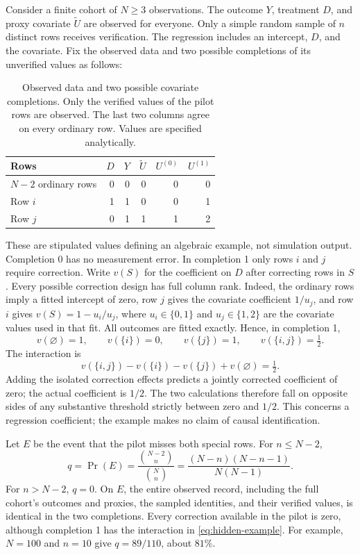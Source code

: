 \documentclass[11pt]{article}
\begin{document}
Consider a finite cohort of $N\geq 3$ observations. The outcome $Y$, treatment
$D$, and proxy covariate $\widetilde U$ are observed for everyone. Only a simple
random sample of $n$ distinct rows receives verification. The regression includes
an intercept, $D$, and the covariate. Fix the observed data and two possible
completions of its unverified values as follows:
\begin{table}[H]\centering
\begin{tabular}{lrrrrr}
\toprule
Rows & $D$ & $Y$ & $\widetilde U$ & $U^{(0)}$ & $U^{(1)}$ \\
\midrule
$N-2$ ordinary rows & 0 & 0 & 0 & 0 & 0 \\
Row $i$ & 1 & 1 & 0 & 0 & 1 \\
Row $j$ & 0 & 1 & 1 & 1 & 2 \\
\bottomrule
\end{tabular}
\caption{Observed data and two possible covariate completions. Only the verified
values of the pilot rows are observed. The last two columns agree on every
ordinary row. Values are specified analytically.}
\end{table}
These are stipulated values defining an algebraic example, not simulation
output. Completion 0 has no measurement error. In completion 1 only rows $i$
and $j$ require correction. Write $v(S)$ for the coefficient on $D$ after
correcting rows in $S$. Every possible correction design has full column rank.
Indeed, the ordinary rows imply a fitted intercept of zero, row $j$ gives the
covariate coefficient $1/u_j$, and row $i$ gives
$v(S)=1-u_i/u_j$, where $u_i\in\{0,1\}$ and $u_j\in\{1,2\}$ are the covariate
values used in that fit. All outcomes are fitted exactly. Hence, in completion 1,
\begin{equation}
 v(\varnothing)=1,\qquad v(\{i\})=0,\qquad
 v(\{j\})=1,\qquad v(\{i,j\})=\tfrac12.
 \label{eq:hidden-example}
\end{equation}
The interaction is
\begin{equation}
 v(\{i,j\})-v(\{i\})-v(\{j\})+v(\varnothing)=\tfrac12.
\end{equation}
Adding the isolated correction effects predicts a jointly corrected coefficient
of zero; the actual coefficient is $1/2$. The two calculations therefore fall
on opposite sides of any substantive threshold strictly between zero and
$1/2$. This concerns a regression coefficient; the example makes no claim of
causal identification.

Let $E$ be the event that the pilot misses both special rows. For $n\leq N-2$,
\begin{equation}
 q=\Pr(E)=\frac{\binom{N-2}{n}}{\binom{N}{n}}
          =\frac{(N-n)(N-n-1)}{N(N-1)}.
 \label{eq:pilot-miss}
\end{equation}
For $n>N-2$, $q=0$. On $E$, the entire observed record, including the full cohort's
outcomes and proxies, the sampled identities, and their verified values, is
identical in the two completions. Every correction available in the pilot is
zero, although completion 1 has the interaction in
\eqref{eq:hidden-example}. For example, $N=100$ and $n=10$ give
$q=89/110$, about $81\%$.
\end{document}
